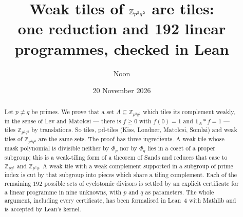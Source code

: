 \documentclass[11pt,a4paper]{amsart}
\title[Weak tiles of $\Z_{p^2q^2}$ are tiles]{Weak tiles of $\Z_{p^2q^2}$ are tiles:\\ one reduction and 192 linear
programmes, checked in Lean}
\author{Noon}
\date{20 November 2026}
\theoremstyle{definition}
\theoremstyle{remark}
\newcommand{\Z}{\mathbb{Z}}
\newcommand{\one}{\mathbf{1}}
\begin{document}
\begin{abstract}
Let $p\ne q$ be primes. We prove that a set $A\subseteq\Z_{p^2q^2}$ which tiles its complement weakly, in the
sense of Lev and Matolcsi --- there is $f\ge 0$ with $f(0)=1$ and $\one_A*f=1$ --- tiles $\Z_{p^2q^2}$ by
translations. So tiles, pd-tiles (Kiss, Londner, Matolcsi, Somlai) and weak tiles of $\Z_{p^2q^2}$ are the same
sets. The proof has three ingredients. A weak tile whose mask polynomial is divisible neither by $\Phi_p$ nor by
$\Phi_q$ lies in a coset of a proper subgroup; this is a weak-tiling form of a theorem of Sands and reduces that case to
$\Z_{pq^2}$ and $\Z_{p^2q}$. A weak tile with a weak complement supported in a subgroup of prime index is cut by
that subgroup into pieces which share a tiling complement. Each of the remaining $192$ possible sets of
cyclotomic divisors is settled by an explicit certificate for a linear programme in nine unknowns, with $p$ and
$q$ as parameters. The whole argument, including every certificate, has been
formalised in Lean~4 with Mathlib and is accepted by Lean's kernel.
\end{abstract}

\maketitle
\end{document}

